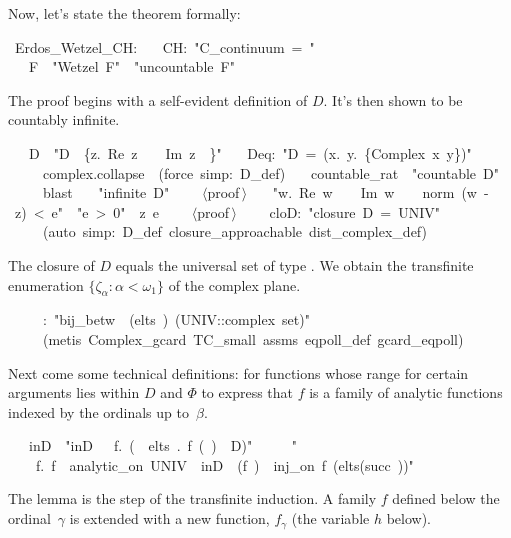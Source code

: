 \documentclass[runningheads]{llncs}
\begin{document}
\newcommand{\prf}{$\langle$proof$\,\rangle$}

Now, let's state the theorem formally:
\begin{isabelle}
\ Erdos\_Wetzel\_CH:\isanewline
\ \ \ CH:\ "C\_continuum\ =\ "\isanewline
\ \ \ F\ \ "Wetzel\ F"\ \ "uncountable\ F"
\end{isabelle}
%
The proof begins with a self-evident definition of $D$. It's then shown to be countably infinite.
\begin{isabelle}
\ \ \ D\ \ "D\ \isasymequiv \ \{z.\ Re\ z\ \isasymin \ \isasymrat \ \isasymand \ Im\ z\ \isasymin \ \isasymrat \}"\isanewline
\ \ \ Deq:\ "D\ =\ (\isasymUnion x\isasymin \isasymrat .\ \isasymUnion y\isasymin \isasymrat .\ \{Complex\ x\ y\})"\isanewline
\ \ \ \ \ complex.collapse\ \ (force\ simp:\ D\_def)\isanewline
\ \ \ countable\_rat\ \ "countable\ D"\isanewline
\ \ \ \ \ blast\isanewline
\ \ \ "infinite\ D"\isanewline
\ \ \ \ \prf\isanewline
\ \ \ "\isasymexists w.\ Re\ w\ \isasymin \ \isasymrat \ \isasymand \ Im\ w\ \isasymin \ \isasymrat \ \isasymand \ norm\ (w\ -\ z)\ <\ e"\ \ "e\ >\ 0"\ \ z\ e\isanewline
\ \ \ \ \prf\isanewline
\ \ \ \ cloD:\ "closure\ D\ =\ UNIV"\isanewline
\ \ \ \ \ (auto\ simp:\ D\_def\ closure\_approachable\ dist\_complex\_def)
\end{isabelle}
The closure of $D$ equals the universal set  of type .
We obtain the transfinite enumeration $\{\zeta_\alpha : \alpha < \omega_1\}$ of the complex plane.
 \begin{isabelle}
\ \ \ \isasymzeta \ \ \isasymzeta :\ "bij\_betw\ \isasymzeta \ (elts\ )\ (UNIV::complex\ set)"\isanewline
\ \ \ \ \ (metis\ Complex\_gcard\ TC\_small\ assms\ eqpoll\_def\ gcard\_eqpoll)
\end{isabelle}
%
Next come some technical definitions:  for functions whose range for certain arguments lies within $D$ and $\Phi$ to express that $f$ is a family of analytic functions indexed by the ordinals up to~$\beta$. 

\begin{isabelle}
\ \ \ inD\ \ "inD\ \isasymequiv \ \isasymlambda \isasymbeta \ f.\ (\isasymforall \isasymalpha \ \isasymin \ elts\ \isasymbeta .\ f\ (\isasymzeta \ \isasymalpha )\ \isasymin \ D)"\isanewline
\ \ \ \isasymPhi \ \ "\isasymPhi \ \isasymequiv\isanewline
\ \  \ \isasymlambda \isasymbeta \ f.\ f\ \isasymbeta \ analytic\_on\ UNIV\ \isasymand \ inD\ \isasymbeta \ (f\ \isasymbeta )\ \isasymand \ inj\_on\ f\ (elts(succ\ \isasymbeta ))"
\end{isabelle}
%
The lemma \isa{*} is the step of the transfinite induction.
A family $f$ defined below the ordinal~$\gamma$ is extended with a new function, $f_\gamma$ (the variable $h$ below).
\end{document}
